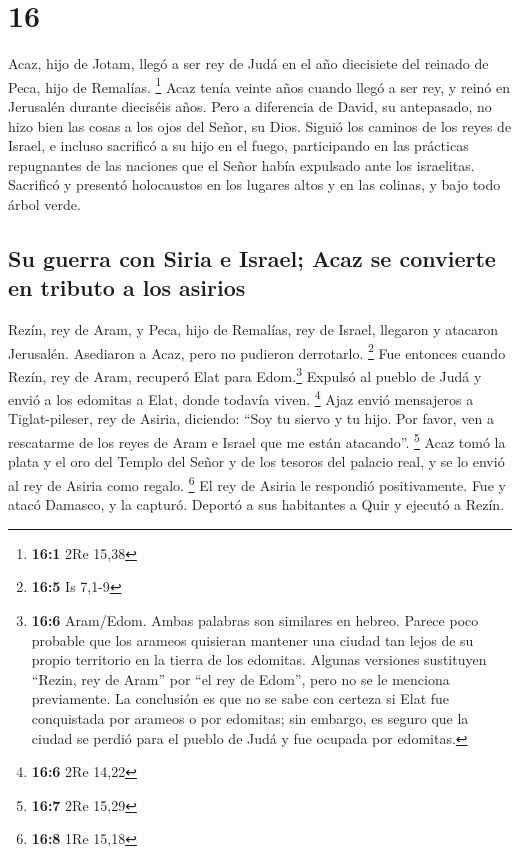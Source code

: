 \hypertarget{section-15}{%
\section{16}\label{section-15}}

 Acaz, hijo de Jotam, llegó a ser rey de Judá en el año
diecisiete del reinado de Peca, hijo de Remalías. \footnote{\textbf{16:1}
  2Re 15,38}  Acaz tenía veinte años cuando llegó a ser
rey, y reinó en Jerusalén durante dieciséis años. Pero a diferencia de
David, su antepasado, no hizo bien las cosas a los ojos del Señor, su
Dios.  Siguió los caminos de los reyes de Israel, e
incluso sacrificó a su hijo en el fuego, participando en las prácticas
repugnantes de las naciones que el Señor había expulsado ante los
israelitas.  Sacrificó y presentó holocaustos en los
lugares altos y en las colinas, y bajo todo árbol verde.

\hypertarget{su-guerra-con-siria-e-israel-acaz-se-convierte-en-tributo-a-los-asirios}{%
\subsection{Su guerra con Siria e Israel; Acaz se convierte en tributo a
los
asirios}\label{su-guerra-con-siria-e-israel-acaz-se-convierte-en-tributo-a-los-asirios}}

 Rezín, rey de Aram, y Peca, hijo de Remalías, rey de
Israel, llegaron y atacaron Jerusalén. Asediaron a Acaz, pero no
pudieron derrotarlo. \footnote{\textbf{16:5} Is 7,1-9} 
Fue entonces cuando Rezín, rey de Aram, recuperó Elat para
Edom.\footnote{\textbf{16:6} Aram/Edom. Ambas palabras son similares en
  hebreo. Parece poco probable que los arameos quisieran mantener una
  ciudad tan lejos de su propio territorio en la tierra de los edomitas.
  Algunas versiones sustituyen ``Rezin, rey de Aram'' por ``el rey de
  Edom'', pero no se le menciona previamente. La conclusión es que no se
  sabe con certeza si Elat fue conquistada por arameos o por edomitas;
  sin embargo, es seguro que la ciudad se perdió para el pueblo de Judá
  y fue ocupada por edomitas.} Expulsó al pueblo de Judá y envió a los
edomitas a Elat, donde todavía viven. \footnote{\textbf{16:6} 2Re 14,22}
 Ajaz envió mensajeros a Tiglat-pileser, rey de Asiria,
diciendo: ``Soy tu siervo y tu hijo. Por favor, ven a rescatarme de los
reyes de Aram e Israel que me están atacando''. \footnote{\textbf{16:7}
  2Re 15,29}  Acaz tomó la plata y el oro del Templo del
Señor y de los tesoros del palacio real, y se lo envió al rey de Asiria
como regalo. \footnote{\textbf{16:8} 1Re 15,18}  El rey de
Asiria le respondió positivamente. Fue y atacó Damasco, y la capturó.
Deportó a sus habitantes a Quir y ejecutó a Rezín.

